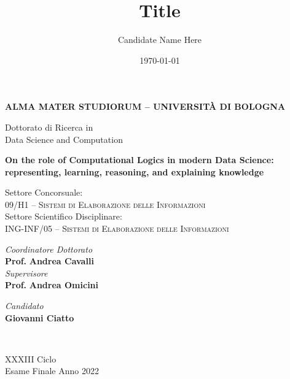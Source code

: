\title{Title}
\author{Candidate Name Here}
\date{\today}

\begin{titlepage}
	\begin{center}
		
		\large
		\textbf{ALMA MATER STUDIORUM -- UNIVERSITÀ DI BOLOGNA}
		\\
		\noindent\hrulefill
		\vspace{0.4cm}
		
		\Large
		Dottorato di Ricerca in
		\\
		Data Science and Computation

		\Huge
		\vspace{4cm}
		\textbf{
			On the role of Computational Logics in modern Data Science: representing, learning, reasoning, and explaining knowledge
		}
		
		\large
		\vspace{1cm}
		Settore Concorsuale:
		\\
		\textsc{09/H1 -- Sistemi di Elaborazione delle Informazioni}
		\\\vspace{0.5cm}
		Settore Scientifico Disciplinare:
		\\
		\textsc{ING-INF/05 -- Sistemi di Elaborazione delle Informazioni}

		
		\vspace{4cm}
		\begin{minipage}[t]{0.64\textwidth}
			\begin{flushleft}
				\textit{Coordinatore Dottorato} 
				\\ 
				\textbf{Prof.} \textbf{Andrea Cavalli}
				\\
				\vspace{0.4cm}
				\textit{Supervisore} 
				\\
				\textbf{Prof.} \textbf{Andrea Omicini}
			\end{flushleft}
		\end{minipage}
		\begin{minipage}[t]{0.34\textwidth}
			\begin{flushright}
				\textit{Candidato} 
				\\ 
				\textbf{Giovanni Ciatto}
			\end{flushright}
		\end{minipage}
		\\
		
		\vfill
		\noindent\hrulefill
		\vspace{0.3cm}
		\Large
		
		XXXIII Ciclo
		\\
		Esame Finale Anno 2022
	\end{center}
\end{titlepage}
\restoregeometry
